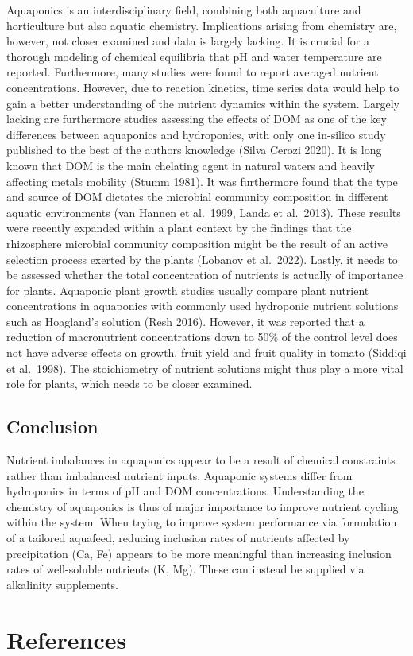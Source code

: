 \documentclass[preprint, 3p,
authoryear]{elsarticle} %
\begin{document}
Aquaponics is an interdisciplinary field, combining both aquaculture and
horticulture but also aquatic chemistry. Implications arising from
chemistry are, however, not closer examined and data is largely lacking.
It is crucial for a thorough modeling of chemical equilibria that pH and
water temperature are reported. Furthermore, many studies were found to
report averaged nutrient concentrations. However, due to reaction
kinetics, time series data would help to gain a better understanding of
the nutrient dynamics within the system. Largely lacking are furthermore
studies assessing the effects of DOM as one of the key differences
between aquaponics and hydroponics, with only one in-silico study
published to the best of the authors knowledge (Silva Cerozi 2020). It
is long known that DOM is the main chelating agent in natural waters and
heavily affecting metals mobility (Stumm 1981). It was furthermore found
that the type and source of DOM dictates the microbial community
composition in different aquatic environments (van Hannen et al.~1999,
Landa et al.~2013). These results were recently expanded within a plant
context by the findings that the rhizosphere microbial community
composition might be the result of an active selection process exerted
by the plants (Lobanov et al.~2022). Lastly, it needs to be assessed
whether the total concentration of nutrients is actually of importance
for plants. Aquaponic plant growth studies usually compare plant
nutrient concentrations in aquaponics with commonly used hydroponic
nutrient solutions such as Hoagland's solution (Resh 2016). However, it
was reported that a reduction of macronutrient concentrations down to
50\% of the control level does not have adverse effects on growth, fruit
yield and fruit quality in tomato (Siddiqi et al.~1998). The
stoichiometry of nutrient solutions might thus play a more vital role
for plants, which needs to be closer examined.

\hypertarget{conclusion}{%
\subsection{Conclusion}\label{conclusion}}

Nutrient imbalances in aquaponics appear to be a result of chemical
constraints rather than imbalanced nutrient inputs. Aquaponic systems
differ from hydroponics in terms of pH and DOM concentrations.
Understanding the chemistry of aquaponics is thus of major importance to
improve nutrient cycling within the system. When trying to improve
system performance via formulation of a tailored aquafeed, reducing
inclusion rates of nutrients affected by precipitation (Ca, Fe) appears
to be more meaningful than increasing inclusion rates of well-soluble
nutrients (K, Mg). These can instead be supplied via alkalinity
supplements.

\hypertarget{references}{%
\section*{References}\label{references}}
\end{document}
